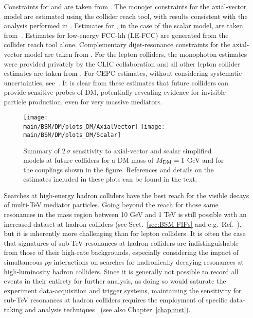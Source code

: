 \documentclass[../report.tex]{subfiles}
\providecommand{\main}{..}
\begin{document}
Constraints for \HLLHC and \HELHC are taken from \cite{CidVidal:2018eel, Haisch:2018bby}.  The \FCChh monojet constraints for the axial-vector model are estimated using the collider reach tool, with results consistent with the analysis performed in \cite{Abada:2019lih}. Estimates for \FCChh, in the case of the scalar model, are taken from~\cite{Harris:2015kda}.  Estimates for low-energy FCC-hh (LE-FCC) are generated from the collider reach tool alone. Complementary dijet-resonance constraints for the axial-vector model are taken from \cite{Golling:2016gvc,Harris:2015kda}.  For the lepton colliders, the \CLIC monophoton estimates were provided privately by the CLIC collaboration and all other lepton collider estimates are taken from \cite{Habermehl:2018yul}. For CEPC estimates, without considering systematic uncertainties, see~\cite{Liu:2019ogn}.
It is clear from these estimates that future colliders can provide sensitive probes of DM, potentially revealing evidence for invisible particle production, even for very massive mediators. 

\begin{figure}[htb]
    \centering
    \texttt{[image: \\main/BSM/DM/plots\_DM/AxialVector]}
    \texttt{[image: \\main/BSM/DM/plots\_DM/Scalar]}
    
\caption{Summary of $2\,\sigma$ sensitivity to axial-vector and scalar simplified models at future colliders for a DM mass of $M_{\rm{DM}}=1$ GeV and for the couplings shown in the figure. References and details on the estimates included in these plots can be found in the text. }
    \label{fig:AxialVectorScalar}
\end{figure}

Searches at high-energy hadron colliders have the best reach for the visible decays of multi-TeV mediator particles. Going beyond the \HLLHC reach for those same resonances in the mass region between 10 GeV and 1 TeV is still possible with an increased dataset at hadron colliders (see Sect.~\ref{sec:BSM-FIPs} and e.g.\ Ref.~\cite{Curtin:2014cca}), but it is inherently more challenging than for lepton colliders. It is often the case that signatures of sub-TeV resonances at hadron colliders are indistinguishable from those of their high-rate backgrounds, especially considering the impact of simultaneous $pp$ interactions on searches for hadronically decaying resonances at high-luminosity hadron colliders. Since it is generally not possible to record all events in their entirety for further analysis, as doing so would saturate the experiment data-acquisition and trigger systems, maintaining the sensitivity for sub-TeV resonances at hadron colliders requires the employment of specific data-taking and analysis techniques~\cite{2018arXiv180208640A} (see also Chapter~\ref{chap:inst}).
\end{document}
